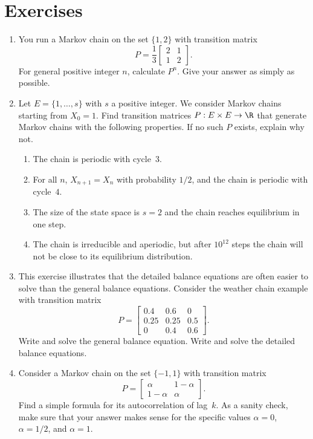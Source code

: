 \section{Exercises}
\label{sec:A.8}

\begin{enumerate}

\item[A.1] You run a Markov chain on the set $\{1, 2\}$ with transition matrix
\[
  P = \frac{1}{3}\begin{bmatrix} 2 & 1 \\ 1 & 2 \end{bmatrix}.
\]
For general positive integer $n$, calculate $P^n$.  Give your answer as simply as possible.

\item[A.2] Let $E = \{1, \ldots, s\}$ with $s$ a positive integer.  We consider Markov chains
starting from $X_0 = 1$.  Find transition matrices $P : E \times E \to \R$ that generate Markov
chains with the following properties.  If no such $P$ exists, explain why not.

\begin{enumerate}[label=\alph*)]
  \item The chain is periodic with cycle~$3$.

  \item For all $n$, $X_{n+1} = X_n$ with probability $1/2$, and the chain is periodic with
    cycle~$4$.

  \item The size of the state space is $s = 2$ and the chain reaches equilibrium in one step.

  \item The chain is irreducible and aperiodic, but after $10^{12}$ steps the chain will not be
    close to its equilibrium distribution.
\end{enumerate}

\item[A.3] This exercise illustrates that the detailed balance equations are often easier to solve
than the general balance equations.  Consider the weather chain example with transition matrix
\[
  P = \begin{bmatrix} 0.4 & 0.6 & 0 \\ 0.25 & 0.25 & 0.5 \\ 0 & 0.4 & 0.6 \end{bmatrix}.
\]
Write and solve the general balance equation.  Write and solve the detailed balance equations.

\item[A.4] Consider a Markov chain on the set $\{-1, 1\}$ with transition matrix
\[
  P = \begin{bmatrix} \alpha & 1 - \alpha \\ 1 - \alpha & \alpha \end{bmatrix}.
\]
Find a simple formula for its autocorrelation of lag~$k$.  As a sanity check, make sure that
your answer makes sense for the specific values $\alpha = 0$, $\alpha = 1/2$, and $\alpha = 1$.

\end{enumerate}
